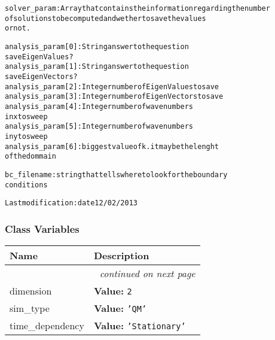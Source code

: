 \begin{boxedminipage}{\funcwidth}
\begin{alltt}
solver\_param:   Array that contains the information regarding the number
                 of solutions to be computed and wether to save the values
                 or not.

                analysis\_param[0]:  String  answer to the question
                                           save  Eigen Values?
                analysis\_param[1]:  String  answer to the question
                                           save  Eigen Vectors?
                analysis\_param[2]:  Integer  number of Eigen Values to save
                analysis\_param[3]:  Integer  number of Eigen Vectors to save 
                analysis\_param[4]:  Integer number of wave numbers 
                                    in x to sweep
                analysis\_param[5]:  Integer number of wave numbers 
                                    in y to sweep
                analysis\_param[6]:  biggest value of k. it may be the lenght
                                    of the dommain                                        
                
bc\_filename:    string that tells where to look for the boundary 
                conditions  
                    
 Last modification: date 12/02/2013
\end{alltt}

\setlength{\parskip}{1ex}
    \end{boxedminipage}



  \subsubsection{Class Variables}

    \vspace{-1cm}
\hspace{\varindent}\begin{longtable}{|p{\varnamewidth}|p{\vardescrwidth}|l}
\cline{1-2}
\cline{1-2} \centering \textbf{Name} & \centering \textbf{Description}& \\
\cline{1-2}
\endhead\cline{1-2}\multicolumn{3}{r}{\small\textit{continued on next page}}\\\endfoot\cline{1-2}
\endlastfoot\raggedright d\-i\-m\-e\-n\-s\-i\-o\-n\- & \raggedright \textbf{Value:} 
{\tt 2}&\\
\cline{1-2}
\raggedright s\-i\-m\-\_\-t\-y\-p\-e\- & \raggedright \textbf{Value:} 
{\tt \texttt{'}\texttt{QM}\texttt{'}}&\\
\cline{1-2}
\raggedright t\-i\-m\-e\-\_\-d\-e\-p\-e\-n\-d\-e\-n\-c\-y\- & \raggedright \textbf{Value:} 
{\tt \texttt{'}\texttt{Stationary}\texttt{'}}&\\
\cline{1-2}
\end{longtable}

